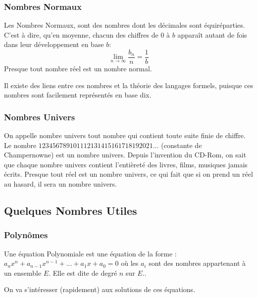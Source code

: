\documentclass{beamercours}
\begin{document}
\begin{frame}
    \frametitle{Nombres Normaux}
    Les Nombres Normaux, sont des nombres dont les décimales sont équiréparties. C'est à dire, qu'en moyenne, chacun des chiffres de $0$ à $b$ apparaît autant de fois dans leur développement en base $b$: 
    \[
        \lim_{n \to \infty} \frac{b_{n}}{n} = \frac{1}{b}
    \]
    Presque tout nombre réel est un nombre normal.

    Il existe des liens entre ces nombres et la théorie des langages formels, puisque ces nombres sont \og facilement \fg représentés en base dix.    
\end{frame}

\begin{frame}
    \frametitle{Nombres Univers}
    On appelle nombre univers tout nombre qui contient toute suite finie de chiffre.
    Le nombre $123456789101112131415161718192021\ldots$ (constante de Champernowne) est un nombre univers. Depuis l'invention du CD-Rom, on sait que chaque nombre univers contient l'entièreté des livres, films, musiques jamais écrits.
    Presque tout réel est un nombre univers, ce qui fait que si on prend un réel au hasard, il sera un nombre univers.
\end{frame}


\subsection{Quelques Nombres Utiles}
\begin{frame}
    \frametitle{Polynômes}
    \begin{definition}
        Une équation Polynomiale est une équation de la forme : $a_{n}x^{n} + a_{n-1}x^{n-1} + \ldots + a_{1}x + a_{0} = 0$ où les $a_{i}$ sont des nombres appartenant à un ensemble $E$. Elle est dite de degré $n$ sur $E$..
    \end{definition}    

    On va s'intéresser (rapidement) aux solutions de ces équations. 

    
\end{frame}
\end{document}
